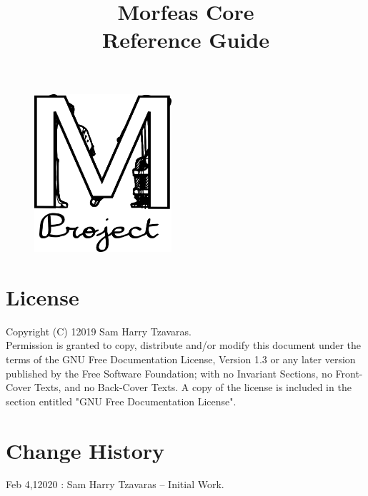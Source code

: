 \documentclass{article}
\title{Morfeas Core\\Reference Guide }
\author{}
\date{}
\begin{document}
\clearpage
\begin{figure}
\centering
  \includegraphics[width=2in]{ArtWork/Morfeas_logo.png}
\end{figure}
\maketitle
\thispagestyle{empty}
\newpage
\section{License}
Copyright (C)  12019  Sam Harry Tzavaras.\\
Permission is granted to copy, distribute and/or modify this document
under the terms of the GNU Free Documentation License, Version 1.3
or any later version published by the Free Software Foundation;
with no Invariant Sections, no Front-Cover Texts, and no Back-Cover Texts.
A copy of the license is included in the section entitled "GNU Free Documentation License".

\section{Change History}
Feb 4,12020 : Sam Harry Tzavaras -- Initial Work.

\newpage
\tableofcontents
\newpage






\newpage

\end{document}
